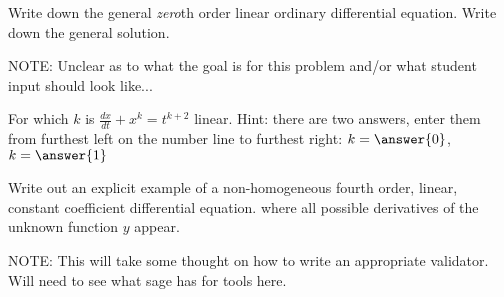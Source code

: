\documentclass{ximera}
\begin{document}
\begin{exercise}%
    Write down the general \emph{zero}th order linear ordinary differential equation.  Write down the general solution.
    
    NOTE: Unclear as to what the goal is for this problem and/or what student input should look like...
\end{exercise}

\begin{exercise}%
    For which $k$ is $\frac{dx}{dt}+x^k = t^{k+2}$ linear.  Hint: there are two answers, enter them from furthest left on the number line to furthest right: $k = \answer{0}$, $k = \answer{1}$
\end{exercise}

\begin{exercise}
    Write out an explicit example of a non-homogeneous fourth order, linear, constant coefficient differential equation. where all possible derivatives of the unknown function $y$ appear. 
    
    NOTE: This will take some thought on how to write an appropriate validator. Will need to see what sage has for tools here.
\end{exercise}
\end{document}
